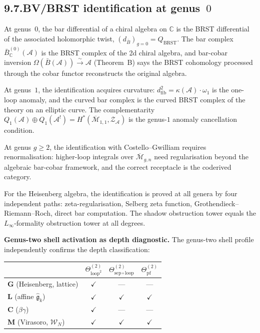 \documentclass[11pt,reqno]{amsart}
\theoremstyle{definition}
\theoremstyle{remark}
\providecommand{\cA}{\mathcal{A}}
\providecommand{\cM}{\mathcal{M}}
\providecommand{\cZ}{\mathcal{Z}}
\providecommand{\barB}{\bar{B}}
\numberwithin{equation}{section}
\begin{document}
\subsection*{9.7.\enspace BV/BRST identification at genus~$0$}

At genus~$0$, the bar differential of a chiral algebra on $\mathbb C$
is the BRST differential of the associated holomorphic twist,
$(d_{\barB})_{g=0}=Q_{\mathrm{BRST}}$. The bar complex
$\barB^{(0)}_{\mathbb C}(\cA)$ is the BRST complex of the 2d chiral
algebra, and bar-cobar inversion
$\Omega(\barB(\cA))\xrightarrow{\sim}\cA$ (Theorem~B) says the BRST
cohomology processed through the cobar functor reconstructs the
original algebra.

At genus~$1$, the identification acquires curvature:
$d^2_{\mathrm{fib}}=\kappa(\cA)\cdot\omega_1$ is the one-loop anomaly,
and the curved bar complex is the curved BRST complex of the theory
on an elliptic curve. The complementarity
$Q_1(\cA)\oplus Q_1(\cA^!)=H^*(\overline{\cM}_{1,1},\cZ_\cA)$ is the
genus-$1$ anomaly cancellation condition.

At genus $g\ge 2$, the identification with Costello--Gwilliam
requires renormalisation: higher-loop integrals over
$\overline{\cM}_{g,n}$ need regularisation beyond the algebraic
bar-cobar framework, and the correct receptacle is the coderived
category.

For the Heisenberg algebra, the identification is proved at all genera
by four independent paths: zeta-regularisation, Selberg zeta function,
Grothendieck--Riemann--Roch, direct bar computation. The shadow
obstruction tower equals the $L_\infty$-formality obstruction tower
at all degrees.

\medskip
\noindent\textbf{Genus-two shell activation as depth diagnostic.}\enspace
The genus-two shell profile independently confirms the depth
classification:

\begin{center}
\renewcommand{\arraystretch}{1.15}
\begin{tabular}{lccc}
& $\Theta^{(2)}_{\mathrm{loop}^2}$ & $\Theta^{(2)}_{\mathrm{sep}\circ\mathrm{loop}}$ & $\Theta^{(2)}_{\mathrm{pf}}$\\
\hline
\textbf{G} (Heisenberg, lattice) & $\checkmark$ & --- & ---\\
\textbf{L} (affine $\widehat{\mathfrak g}_k$) & $\checkmark$ & $\checkmark$ & $\checkmark$\\
\textbf{C} ($\beta\gamma$) & $\checkmark$ & --- & ---\\
\textbf{M} (Virasoro, $\mathcal W_N$) & $\checkmark$ & $\checkmark$ & $\checkmark$
\end{tabular}
\end{center}
\end{document}
